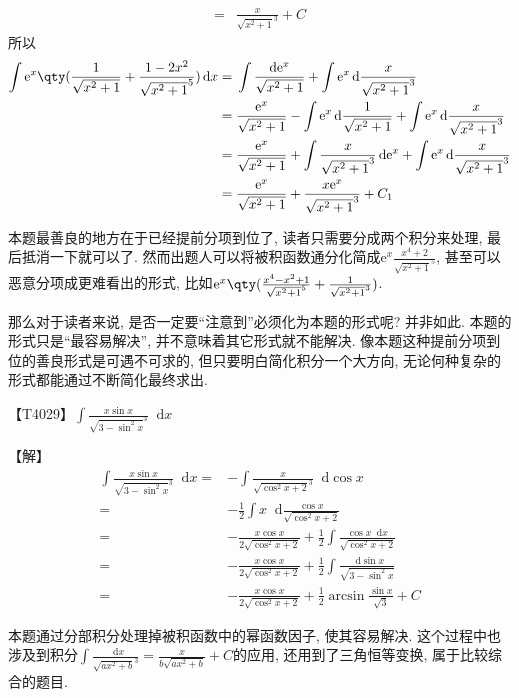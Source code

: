 \documentclass{ctexbook}
\newcommand{\e}{\mathrm{e}}
\newcommand*{\dif}{\mathop{}\!\mathrm{d}}
\begin{document}
{\begin{align*}
={}&\frac{x}{\sqrt{x^{2}+1}^{3}}+C
\end{align*}
所以
\begin{align*}
\int\e^{x}\qty(\frac{1}{\sqrt{x^{2}+1}}+\frac{1-2x^{2}}{\sqrt{x^{2}+1}^{5}})\dif{x}={}&\int\frac{\dif{\e^{x}}}{\sqrt{x^{2}+1}}+\int\e^{x}\dif{\frac{x}{\sqrt{x^{2}+1}^{3}}}\\
={}&\frac{\e^{x}}{\sqrt{x^{2}+1}}-\int\e^{x}\dif{\frac{1}{\sqrt{x^{2}+1}}}+\int\e^{x}\dif{\frac{x}{\sqrt{x^{2}+1}^{3}}}\\
={}&\frac{\e^{x}}{\sqrt{x^{2}+1}}+\int\frac{x}{\sqrt{x^{2}+1}^{3}}\dif{\e^{x}}+\int\e^{x}\dif{\frac{x}{\sqrt{x^{2}+1}^{3}}}\\
={}&\frac{\e^{x}}{\sqrt{x^{2}+1}}+\frac{x\e^{x}}{\sqrt{x^{2}+1}^{3}}+C_{1}
\end{align*}\par
{\kaishu 本题最善良的地方在于已经提前分项到位了, 读者只需要分成两个积分来处理, 最后抵消一下就可以了. 然而出题人可以将被积函数通分化简成$\e^{x}\frac{x^{4}+2}{\sqrt{x^{2}+1}^{5}}$, 甚至可以恶意分项成更难看出的形式, 比如$\e^{x}\qty(\frac{x^{4}-x^{2}+1}{\sqrt{x^{2}+1}^{5}}+\frac{1}{\sqrt{x^{2}+1}^{3}})$. \par
那么对于读者来说, 是否一定要“注意到”必须化为本题的形式呢? 并非如此. 本题的形式只是“最容易解决”, 并不意味着其它形式就不能解决. 像本题这种提前分项到位的善良形式是可遇不可求的, 但只要明白简化积分一个大方向, 无论何种复杂的形式都能通过不断简化最终求出. \par}
【T4029】$\int\frac{x\sin{x}}{\sqrt{3-\sin^{2}{x}}^{3}}\dif{x}$\par
【解】
\begin{align*}
\int\frac{x\sin{x}}{\sqrt{3-\sin^{2}{x}}^{3}}\dif{x}={}&-\int\frac{x}{\sqrt{\cos^{2}{x}+2}^{3}}\dif{\cos{x}}\\
={}&-\frac{1}{2}\int x\dif{\frac{\cos{x}}{\sqrt{\cos^{2}{x}+2}}}\\
={}&-\frac{x\cos{x}}{2\sqrt{\cos^{2}{x}+2}}+\frac{1}{2}\int\frac{\cos{x}\dif{x}}{\sqrt{\cos^{2}{x}+2}}\\
={}&-\frac{x\cos{x}}{2\sqrt{\cos^{2}{x}+2}}+\frac{1}{2}\int\frac{\dif{\sin{x}}}{\sqrt{3-\sin^{2}{x}}}\\
={}&-\frac{x\cos{x}}{2\sqrt{\cos^{2}{x}+2}}+\frac{1}{2}\arcsin{\frac{\sin{x}}{\sqrt{3}}}+C
\end{align*}\par
{\kaishu 本题通过分部积分处理掉被积函数中的幂函数因子, 使其容易解决. 这个过程中也涉及到积分$\int\frac{\dif{x}}{\sqrt{ax^{2}+b}^{3}}=\frac{x}{b\sqrt{ax^{2}+b}}+C$的应用, 还用到了三角恒等变换, 属于比较综合的题目. \par}
}
\end{document}
